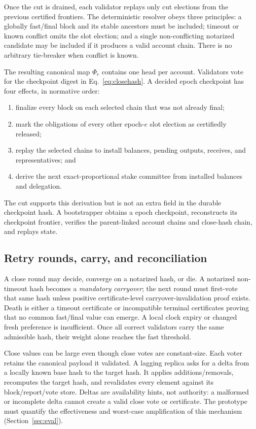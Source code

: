 \documentclass[sigplan,review,anonymous]{acmart}
\newcommand{\frontier}{\Phi}
\begin{document}
Once the cut is drained, each validator replays only cut elections from the previous certified frontiers.  The deterministic resolver obeys three principles: a globally fast/final block and its stable ancestors must be included; timeout or known conflict omits the slot election; and a single non-conflicting notarized candidate may be included if it produces a valid account chain.  There is no arbitrary tie-breaker when conflict is known.

The resulting canonical map $\frontier_e$ contains one head per account.  Validators vote for the checkpoint digest in Eq.~\eqref{eq:closehash}.  A decided epoch checkpoint has four effects, in normative order:
\begin{enumerate}[leftmargin=1.3em,itemsep=1pt,topsep=2pt]
\item finalize every block on each selected chain that was not already final;
\item mark the obligations of every other epoch-$e$ slot election as certifiedly released;
\item replay the selected chains to install balances, pending outputs, receives, and representatives; and
\item derive the next exact-proportional stake committee from installed balances and delegation.
\end{enumerate}
The cut supports this derivation but is not an extra field in the durable checkpoint hash.  A bootstrapper obtains a epoch checkpoint, reconstructs its checkpoint frontier, verifies the parent-linked account chains and close-hash chain, and replays state.

\subsection{Retry rounds, carry, and reconciliation}

A close round may decide, converge on a notarized hash, or die.  A notarized non-timeout hash becomes a \emph{mandatory carryover}; the next round must first-vote that same hash unless positive certificate-level carryover-invalidation proof exists.  Death is either a timeout certificate or incompatible terminal certificates proving that no common fast/final value can emerge.  A local clock expiry or changed fresh preference is insufficient.  Once all correct validators carry the same admissible hash, their weight alone reaches the fast threshold.

Close values can be large even though close votes are constant-size.  Each voter retains the canonical payload it validated.  A lagging replica asks for a delta from a locally known base hash to the target hash.  It applies additions/removals, recomputes the target hash, and revalidates every element against its block/report/vote store.  Deltas are availability hints, not authority: a malformed or incomplete delta cannot create a valid close vote or certificate.  The prototype must quantify the effectiveness and worst-case amplification of this mechanism (Section~\ref{sec:eval}).
\end{document}
